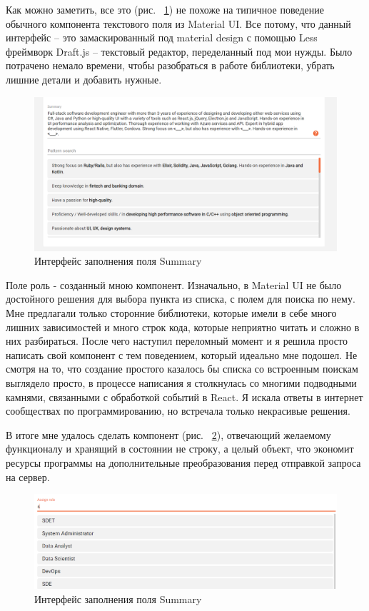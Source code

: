\documentclass[a4paper,12pt]{diplom}
\begin{document}
Как можно заметить, все это (рис. ~\ref{7}) не похоже на типичное поведение обычного компонента текстового поля из Material UI. Все потому, что данный интерфейс -- это
замаскированный под material design с помощью Less фреймворк Draft.js -- текстовый редактор, переделанный под мои нужды. Было потрачено немало времени, чтобы разобраться в работе библиотеки,
убрать лишние детали и добавить нужные.

\begin{figure}[!ht]
	\centering
	\includegraphics[width=1\textwidth]{resources/summary.png}
	\caption{Интерфейс заполнения поля Summary}
	\label{7}
\end{figure}

Поле роль - созданный мною компонент. Изначально, в Material UI не было достойного решения для выбора пункта из списка, с полем для поиска по нему.
Мне предлагали только сторонние библиотеки, которые имели в себе много лишних зависимостей и много строк кода, которые неприятно читать и сложно в них разбираться.
После чего наступил переломный момент и я решила просто написать свой компонент с тем поведением, который идеально мне подошел. Не смотря на то, что создание простого казалось бы списка со встроенным поискам выглядело просто, 
в процессе написания я столкнулась со многими подводными камнями, связанными с обработкой событий в React. Я искала ответы в интернет сообществах по программированию,
но встречала только некрасивые решения. 

В итоге мне удалось сделать компонент (рис. ~\ref{8}), отвечающий желаемому функционалу и хранящий в состоянии не строку, а целый объект, что
экономит ресурсы программы на дополнительные преобразования перед отправкой запроса на сервер.

\begin{figure}[!ht]
	\centering
	\includegraphics[width=1\textwidth]{resources/role.png}
	\caption{Интерфейс заполнения поля Summary}
	\label{8}
\end{figure}
\end{document}
